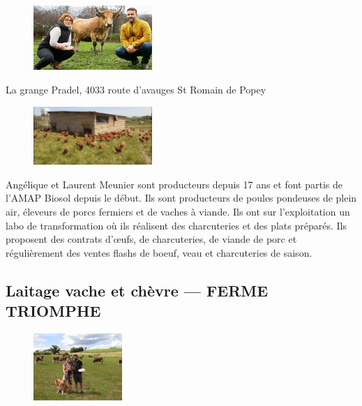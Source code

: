 \documentclass[10pt,a4paper,french]{article}
\makeatletter
\newcommand{\authoredby}[1]{\addtocontents{toc}{\protect\@nameuse{authoredby#1}}}%
\makeatother
\begin{document}
\begin{figure}
\includegraphics[width=0.4\textwidth]{MEUNIER1.jpg}
\end{figure}

\newline
La grange Pradel, 4033 route d'avauges St Romain de Popey \newline

\vspace{9em}

\begin{figure}
\includegraphics[width=0.4\textwidth]{MEUNIER2.jpg}
\end{figure}

\noindent Angélique et Laurent Meunier sont producteurs depuis 17 ans
et font partis de l'AMAP Biosol depuis le début. Ils sont producteurs
de poules pondeuses de plein air, éleveurs de porcs fermiers et de
vaches à viande. Ils ont sur l'exploitation un labo de transformation
où ils réalisent des charcuteries et des plats préparés. Ils proposent
des contrats d'{\oe}ufs, de charcuteries, de viande de porc et
régulièrement des ventes flashs de boeuf, veau et charcuteries de
saison.

\authoredby{B}
\subsection{Laitage vache et chèvre --- FERME TRIOMPHE}\label{subsec:laitage}

\begin{figure}
\includegraphics[width=0.3\textwidth]{TRIOMPHE1.jpg}
\end{figure}
\end{document}
